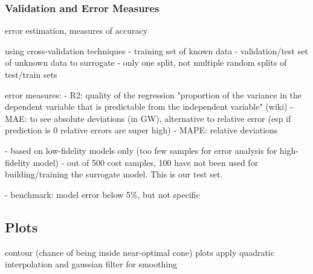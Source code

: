 \subsubsection{Validation and Error Measures}

error estimation, measures of accuracy

using cross-validation techniques 
- training set of known data
- validation/test set of unknown data to surrogate \cite{gratiet_metamodel-based_2015}
- only one split, not multiple random splits of test/train sets

error measures:
- R2: quality of the regression "proportion of the variance in the dependent variable that is predictable from the independent variable" (wiki)
- MAE: to see absolute deviations (in GW), alternative to relative error (esp if prediction is 0 relative errors are super high)
- MAPE: relative deviations

- based on low-fidelity models only (too few samples for error analysis for high-fidelity model)
- out of 500 cost samples, 100 have not been used for building/training the surrogate model. This is our test set.

- benchmark: model error below 5\%, but not specific \cite{trondle_trade-offs_2020}

\subsection{Plots}

contour (chance of being inside near-optimal cone) plots apply quadratic interpolation and gaussian filter for smoothing
